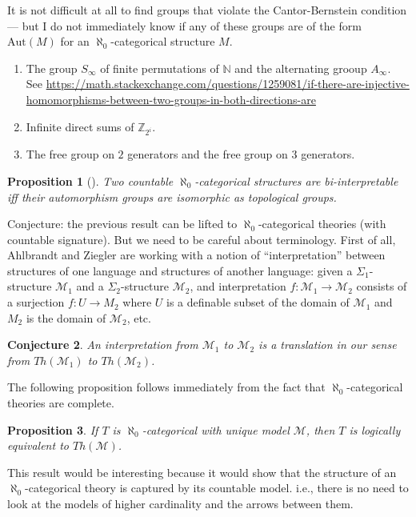 \documentclass[12pt]{article}
\newtheorem{prop}{Proposition}
\newtheorem{conj}[prop]{Conjecture}
\theoremstyle{definition}
\theoremstyle{remark}
\newcommand{\3}{\mathcal}
\begin{document}
It is not difficult at all to find groups that violate the
Cantor-Bernstein condition --- but I do not immediately know if any of
these groups are of the form $\mathrm{Aut}(M)$ for an
$\aleph _0$-categorical structure $M$.

\begin{enumerate}
\item The group $S_\infty$ of finite permutations of $\mathbb{N}$ and
  the alternating grooup $A_\infty$. See  \url{https://math.stackexchange.com/questions/1259081/if-there-are-injective-homomorphisms-between-two-groups-in-both-directions-are}
\item Infinite direct sums of $\mathbb{Z}_{2^i}$.
\item The free group on $2$ generators and the free group on $3$ generators.  
\end{enumerate}

\begin{prop}[\cite{ahlbrandt1986}] Two countable
  $\aleph _0$-categorical structures are bi-interpretable iff their
  automorphism groups are isomorphic as topological groups. \end{prop}

Conjecture: the previous result can be lifted to
$\aleph _0$-categorical theories (with countable signature). But we
need to be careful about terminology. First of all, Ahlbrandt and
Ziegler are working with a notion of ``interpretation'' between
structures of one language and structures of another language: given a
$\Sigma _1$-structure $\3M _1$ and a $\Sigma _2$-structure $\3M _2$,
and interpretation $f:\3M_1\to \3M_2$ consists of a surjection
$f:U\to M_2$ where $U$ is a definable subset of the domain of $\3M_1$
and $M_2$ is the domain of $\3M_2$, etc.

\begin{conj} An interpretation from $\3M_1$ to $\3M_2$ is a
  translation in our sense from $Th(\3M_1)$ to $Th(\3M_2)$. \end{conj}

The following proposition follows immediately from the fact that
$\aleph _0$-categorical theories are complete.

\begin{prop} If $T$ is $\aleph _0$-categorical with unique model
  $\3M$, then $T$ is logically equivalent to $Th(\3M )$. \end{prop}

This result would be interesting because it would show that the
structure of an $\aleph _0$-categorical theory is captured by its
countable model. i.e., there is no need to look at the models of
higher cardinality and the arrows between them.
\end{document}
